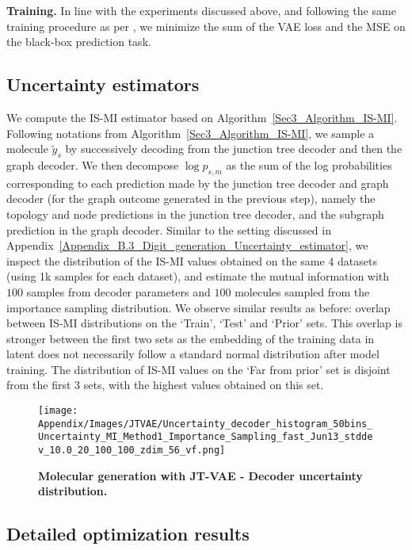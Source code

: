 \textbf{Training.} In line with the experiments discussed above, and following the same training procedure as per \citet{jin2019junction}, we minimize the sum of the VAE loss and the MSE on the black-box prediction task.

\subsection{Uncertainty estimators}
\label{Appendix_E.3_Molecule_JTVAE_Uncertainty_estimator}
We compute the IS-MI estimator based on Algorithm~\ref{Sec3_Algorithm_IS-MI}. Following notations from Algorithm~\ref{Sec3_Algorithm_IS-MI}, we sample a molecule $\tilde{y}_s$ by successively decoding from the junction tree decoder and then the graph decoder. We then decompose $\log{p_{s,m}}$ as the sum of the log probabilities corresponding to each prediction made by the junction tree decoder and graph decoder (for the graph outcome generated in the previous step), namely the topology and node predictions in the junction tree decoder, and the subgraph prediction in the graph decoder. 
Similar to the setting discussed in Appendix~\ref{Appendix_B.3_Digit_generation_Uncertainty_estimator}, we inspect the distribution of the IS-MI values obtained on the same 4 datasets (using 1k samples for each dataset), and estimate the mutual information with $100$ samples from decoder parameters and $100$ molecules sampled from the importance sampling distribution. We observe similar results as before: overlap between IS-MI distributions on the `Train', `Test' and `Prior' sets. This overlap is stronger between the first two sets as the embedding of the training data in latent does not necessarily follow a standard normal distribution after model training. The distribution of IS-MI values on the `Far from prior' set is disjoint from the first 3 sets, with the highest values obtained on this set.

\begin{figure}[h!]
    \centering
    \texttt{[image: Appendix/Images/JTVAE/Uncertainty\_decoder\_histogram\_50bins\_Uncertainty\_MI\_Method1\_Importance\_Sampling\_fast\_Jun13\_stddev\_10.0\_20\_100\_100\_zdim\_56\_vf.png]}
    \caption{\textbf{Molecular generation with JT-VAE - Decoder uncertainty distribution.}}
    \label{Appendix_Fig_JTVAE_Uncertainty_estimator}
\end{figure}

\subsection{Detailed optimization results}


